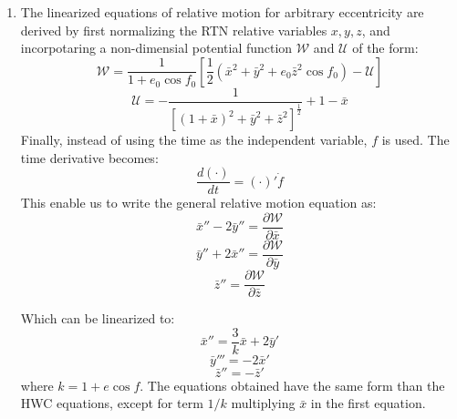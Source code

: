 \documentclass[a4paper]{article}
\begin{document}
\begin{enumerate}[label=\emph{\alph*)}]
  \item The linearized equations of relative motion for arbitrary eccentricity are derived by first normalizing the RTN relative variables $x,y,z$, and incorpotaring a non-dimensial potential function $\mathscr{W}$ and $\mathscr{U}$ of the form:
   \[ \mathscr{W} = \frac{1}{1+e_0 \cos{f_0}} \left[ \frac{1}{2}(\bar{x}^2+\bar{y}^2+e_0 \bar{z}^2 \cos{f_0})-\mathscr{U} \right]  \]
   \[\mathscr{U} = -\frac{1}{\left[(1+\bar{x})^2+\bar{y}^2+\bar{z}^2 \right]^{\frac{1}{2}}}+1-\bar{x}\]
   Finally, instead of using the time as the independent variable, $f$ is used. The time derivative becomes:
   \[\frac{d(\cdot)}{dt}=(\cdot)'\dot{f}\]
   This enable us to write the general relative motion equation as:
   \[\bar{x}''-2\bar{y}''=\frac{\partial\mathscr{W}}{\partial\bar{x}}\]
   \[\bar{y}''+2\bar{x}''=\frac{\partial\mathscr{W}}{\partial\bar{y}}\]
   \[\bar{z}''=\frac{\partial\mathscr{W}}{\partial\bar{z}}\]

   Which can be linearized to:
   \[\bar{x}'' = \frac{3}{k} \bar{x}+2\bar{y}'\]
   \[\bar{y}'''= -2\bar{x}' \]
   \[\bar{z}'' = -\bar{z}' \]
   where $k =  1+e\cos{f}$. The equations obtained have the same form than the HWC equations, except for term $1/k$ multiplying $\bar{x}$ in the first equation. 


\end{enumerate}
\end{document}
